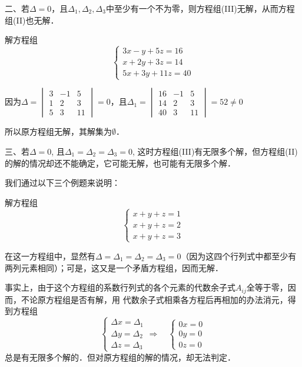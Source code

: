 二、若$\Delta=0$，且$\Delta_1,\Delta_2,\Delta_3$中至少有一个不为零，则方程组(III)无解，从而方程组(II)也无解．

\begin{example}
    解方程组
    \[\begin{cases}
        3x-y+5z=16\\
        x+2y+3z=14\\
        5x+3y+11z=40
    \end{cases}\]
\end{example}

\begin{solution}
因为$\Delta=\begin{vmatrix}
    3&-1&5\\1&2&3\\5&3&11
\end{vmatrix}=0$，且$\Delta_1=\begin{vmatrix}
    16&-1&5\\14&2&3\\40&3&11
\end{vmatrix}=52\ne 0$
    
所以原方程组无解，其解集为$\emptyset$．
\end{solution}

三、若$\Delta=0$, 且$\Delta_1=\Delta_2=\Delta_3=0$, 这时方程组(III)有无限多个解，但方程组(II)的解的情况却还不能确定，它可能无解，也可能有无限多个解．

我们通过以下三个例题来说明：
\begin{example}
    解方程组
\[\begin{cases}
    x+y+z=1\\x+y+z=2\\x+y+z=3
\end{cases}\]
\end{example}

\begin{solution}
在这一方程组中，显然有$\Delta=\Delta_1=\Delta_2=\Delta_3=0$（因为这四个行列式中都至少有两列元素相同）；可是，这又是一个矛盾方程组，因而无解．

事实上，由于这个方程组的系数行列式的各个元素的代数余子式$A_{ij}$全等于零，因而，不论原方程组是否有解，用
代数余子式相乘各方程后再相加的办法消元，得到方程组
\[\begin{cases}
    \Delta x=\Delta_1\\
    \Delta y=\Delta_2\\
    \Delta z=\Delta_3
\end{cases}\Rightarrow\quad \begin{cases}
    0x=0\\0y=0\\0z=0
\end{cases}\]
总是有无限多个解的．但对原方程组的解的情况，却无法判定．
\end{solution}

